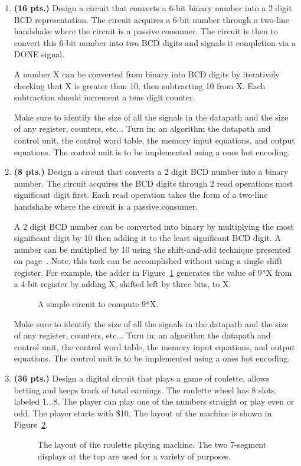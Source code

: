 \begin{enumerate}
\item \textbf{ (16 pts.)} Design a circuit that converts a 6-bit binary number into a 2 
digit BCD representation.  The circuit acquires a 6-bit number through
a two-line handshake where the circuit is a passive consumer.  The 
circuit is then to convert this 6-bit number into two BCD digits and
signals it completion via a DONE signal.

A number X can be converted from binary into BCD digits by iteratively
checking that X is greater than 10, then subtracting 10 from X.  Each
subtraction should increment a tens digit counter.

Make sure to identify the size of all the signals in the datapath
and the size of any register, counters, etc...
Turn in; an algorithm the datapath and control unit, the control word 
table, the memory input equations, and output equations.  
The control unit is to be implemented using a ones hot encoding.

 
\item \textbf{ (8 pts.)}
Design a circuit that converts a 2 digit BCD number into a
binary number.  The circuit acquires the BCD digits through 2 read
operations most significant digit first.  Each read operation takes 
the form of a two-line handshake where the circuit is a passive 
consumer.

A 2 digit BCD number can be converted into binary by multiplying the
most significant digit by 10 then adding it to the least significant
BCD digit.  A number can be multiplied by 10 using the shift-and-add
technique presented on page~\pageref{page:MulyBy10}.  Note, this
task can be accomplished without using a single shift register.
For example, the adder in Figure~\ref{fig:NineTimes} generates the value
of 9*X from a 4-bit register by adding X, shifted left by three bits, to X.

\begin{figure}[ht]
\caption{A simple circuit to compute 9*X.}
\label{fig:NineTimes}
\end{figure}

Make sure to identify the size of all the signals in the datapath
and the size of any register, counters, etc...
Turn in; an algorithm the datapath and control unit, the control word 
table, the memory input equations, and output equations.  
The control unit is to be implemented using a ones hot encoding.

 
\item \textbf{ (36 pts.)}
Design a digital circuit that plays a game of
roulette, allows betting and keeps track of total earnings.
The roulette wheel has 8 slots, labeled $1 \ldots 8$.  The player
can play one of the numbers straight or play even or odd.
The player starts with \$10. 
The layout of the machine is shown in Figure~\ref{fig:Roulette}.
\begin{figure}[ht]
\caption{The layout of the roulette playing machine.  
The two 7-segment displays at the top are used for a variety
of purposes.}
\label{fig:Roulette}
\end{figure}


\end{enumerate}
